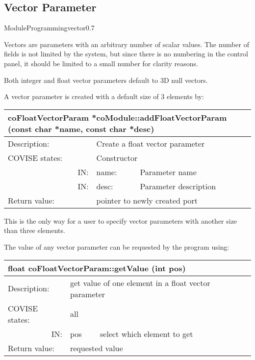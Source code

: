  

\subsection{Vector Parameter}

\begin{covimgpath}{ModuleProgramming}{vector}{0.7} \end{covimgpath}


Vectors are parameters with an arbitrary number of scalar values. The number of fields
is not limited by the system, but since there is no numbering in the control panel, it
should be limited to a small number for clarity reasons.

Both integer and float vector parameters default to 3D null vectors.

A vector parameter is created with a default size of 3 elements by:



\begin{longtable}{|p{4cm}|p{2.5cm}|p{7cm}|}
\hline
\multicolumn{3}{|p{13.5cm}|}{\bf coFloatVectorParam *coModule::addFloatVectorParam 
(const char *name, const char *desc)} \\
\hline
{Description:}   
                        & \multicolumn{2}{|p{9.5cm}|}{Create a float vector parameter} \\
\hline
{COVISE states:} & \multicolumn{2}{|p{9.5cm}|}{Constructor} \\
\hline
\multicolumn{1}{|r|}{IN:} & {name:} 
                             & {Parameter name}\\
\hline
\multicolumn{1}{|r|}{IN:} & {desc:} 
                            & {Parameter description}\\
\hline
{Return value:}  
                        & \multicolumn{2}{|p{9.5cm}|}{pointer to newly created port} \endhead
\hline
\end{longtable}

This is the only way for a user to specify vector parameters with another size than 
three elements.

The value of any vector parameter can be requested by the program using:


\begin{longtable}{|p{4cm}|p{2.5cm}|p{7cm}|}
\hline
\multicolumn{3}{|p{13.5cm}|}{\bf float coFloatVectorParam::getValue (int pos)} \\
\hline
{Description:}   
              & \multicolumn{2}{|p{9.5cm}|}{get value of one element in a float vector parameter} \\
\hline
{COVISE states:} & \multicolumn{2}{|p{9.5cm}|}{all} \\
\hline
\multicolumn{1}{|r|}{IN:} & {pos} 
                             & {select which element to get}\\
\hline
{Return value:}  
                        & \multicolumn{2}{|p{9.5cm}|}{requested value} \endhead
\hline
\end{longtable}

